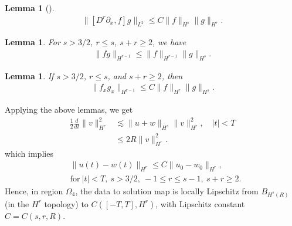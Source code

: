 \documentclass[a0,portrait]{a0poster}
\newtheorem{lemma}[theorem]{Lemma}
\newcommand{\p}{\partial}
\begin{document}
\begin{multicols}{3}
\begin{lemma}[\cite{Himonas_2009_Non-uniform-dep-per}]
\begin{equation*}
\begin{split}
\|[D^r \p_x ,f]g\|_{L^2} \le C \|f\|_{H^s} \|g\|_{H^r}.
\end{split}
\end{equation*}
%
%
\end{lemma}
%
%
%
%
\begin{lemma}
For $s > 3/2$, $r \le s$, $s + r \ge 2$, we have
%
%
\begin{equation*}
\begin{split}
  \| fg \|_{H^{r-1}} \le \| f \|_{H^{r-1}} \| g \|_{H^{s}}.
\end{split}
\end{equation*}
%
%
\label{lem:frac-deriv}
\end{lemma}
%
%
%
%
%
%
%
%
%
\begin{lemma}
\label{impo}
If  $s > 3/2$, $r \le s$, and $s + r \ge 2$,  then
%
%
\begin{equation*}
\begin{split}
  \|f_{x}g_{x}\|_{H^{r - 1}} \le C \|f\|_{H^{r}}
\|g\|_{H^{s}}.
\label{11}
\end{split}
\end{equation*}
%
%
\end{lemma}
%
Applying the above lemmas, we get 
%
%
%
\begin{equation*}
\begin{split}
\frac{1}{2} \frac{d}{dt}
\|v\|_{H^r}^2
& \lesssim \|u+w\|_{H^s}
\|v\|_{H^r}^2, \quad | t | < T
\\
& \le 2R \| v \|_{H^{r}}^{2}.
\end{split}
\end{equation*}
%
%
%
%
%
%
%
which implies
%
%
\begin{equation}
  \label{lip-ineq}
\begin{split}
  & \| u(t) - w(t) \|_{H^{r}} \le C \| u_{0} - w_{0} \|_{H^{r}}, 
  \\
  & \text{for} \ | t | < T,
  \ s > 3/2, \ -1 \le r \le s-1, \ s + r \ge 2.
\end{split}
\end{equation}
%
Hence, in region $\Omega_{4}$, the data to solution map is locally Lipschitz from
$B_{H^{s}(R)}$ (in the $H^{r}$
topology) to $C([-T, T], H^{r})$, with Lipschitz constant $C = C(s, r, R)$.
%
%
%
%
%
%
%
%
%
%

\end{multicols}
\end{document}
